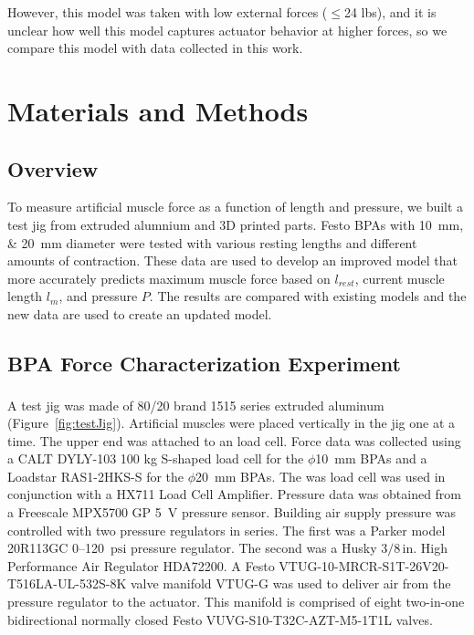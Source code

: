 \documentclass[actuators,article,accept,pdftex,moreauthors]{Definitions/mdpi}
\begin{document}
However, this model was taken with low external forces ($\leq$24 lbs), and it is unclear how well this model captures actuator behavior at higher forces, so we compare this model with data collected in this work.

\section{Materials and Methods}

\subsection{Overview}

To measure artificial muscle force as a function of length and pressure, we built a test jig from extruded alumnium and 3D printed parts. Festo BPAs with \qtylist{10;20}{\mm} diameter were tested with various resting lengths and different amounts of contraction. These data are used to develop an improved model that more accurately predicts maximum muscle force based on $l_{rest}$, current muscle length $l_{m}$, and pressure $P$. The results are compared with existing models and the new data are used to create an updated model. 

\subsection{BPA Force Characterization Experiment}
A test jig was made of 80/20\textsuperscript{{\textregistered}} brand 1515 series extruded aluminum (Figure~\ref{fig:testJig}). Artificial muscles were placed vertically in the jig one at a time. The upper end was attached to an {load cell.} %
Force data was collected using a CALT DYLY-103 100 kg S-shaped load cell for the $\phi$\qty{10}{\mm} BPAs and a Loadstar RAS1-2HKS-S for the $\phi$\qty{20}{\mm} BPAs. The was load cell was used in conjunction with a HX711 Load Cell Amplifier. Pressure data was obtained from a Freescale MPX5700 GP \qty{5}{\volt} pressure sensor. Building air supply pressure was controlled with two pressure regulators in series. The first was a Parker model 20R113GC 0--120~$\text{psi}$ pressure regulator. The second was a Husky $3/8\,\text{in.}$ High Performance Air Regulator HDA72200. A Festo VTUG-10-MRCR-S1T-26V20-T516LA-UL-532S-8K valve manifold VTUG-G was used to deliver air from the pressure regulator to the actuator. This manifold is comprised of eight two-in-one bidirectional normally closed Festo VUVG-S10-T32C-AZT-M5-1T1L valves. 
\end{document}
